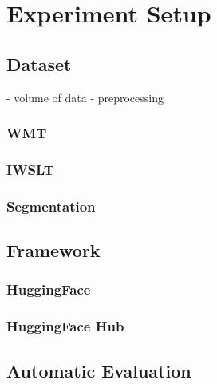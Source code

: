 \chapter{Experiment Setup}

\section{Dataset}
- volume of data
- preprocessing
\subsection{WMT}
\subsection{IWSLT}
\subsection{Segmentation}

\section{Framework}
\subsection{HuggingFace}
\subsection{HuggingFace Hub}

\section{Automatic Evaluation}

